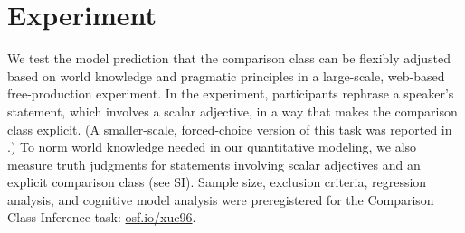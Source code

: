 \documentclass[doc]{apa6}
\newcommand{\mht}[1]{\textcolor{Blue}{[mht: #1]}}
\begin{document}
\section{Experiment}


We test the model prediction that the comparison class can be flexibly adjusted based on world knowledge and pragmatic principles in a large-scale, web-based free-production experiment.
In the experiment, participants rephrase a speaker's statement, which involves a scalar adjective, in a way that makes the comparison class explicit.
(A smaller-scale, forced-choice version of this task was reported in .)
To norm world knowledge needed in our quantitative modeling, we also measure truth judgments for statements involving scalar adjectives and an explicit comparison class (see SI).
Sample size, exclusion criteria, regression analysis, and cognitive model analysis were preregistered for the Comparison Class Inference task: \url{osf.io/xuc96}.


\end{document}
